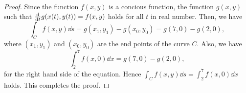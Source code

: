 \documentclass[8pt,twocolumn]{article}
\begin{document}
\begin{Answer}[number=32]
  
  \begin{proof}
    Since the function $f(x,y)$ is a concious function, the function $g(x,y)$
    such that $\dv{t}g(x(t),y(t)) = f(x,y)$ holds for all $t$ in real number.
    Then, we have
    \[
      \int_C f(x,y) \dd{s} = g(x_1,y_1) - g(x_0, y_0) = g(7,0) - g(2,0),
    \]
    where $(x_1,y_1)$ and $(x_0, y_0)$ are the end points of the curve $C$.
    Also, we have
    \[
      \int_2^7 f(x,0) \dd{x} = g(7, 0) - g(2, 0),
    \]
    for the right hand side of the equation. Hence $\int_C f(x,y) \dd{s} =
    \int_2^7 f(x,0) \dd{x}$ holds. This completes the proof.
  \end{proof}
\end{Answer}
\end{document}
